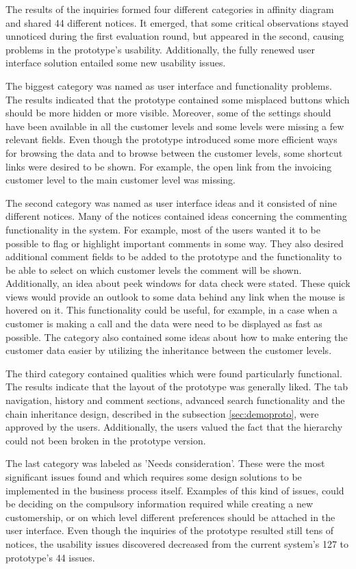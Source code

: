 \documentclass[12pt,a4paper,oneside,pdftex]{report}
\begin{document}
The results of the inquiries formed four different categories in affinity diagram and shared 44 different notices. It emerged, that some critical observations stayed unnoticed during the first evaluation round, but appeared in the second, causing problems in the prototype's usability. Additionally, the fully renewed user interface solution entailed some new usability issues. 

The biggest category was named as user interface and functionality problems. The results indicated that the prototype contained some misplaced buttons which should be more hidden or more visible. Moreover, some of the settings should have been available in all the customer levels and some levels were missing a few relevant fields. Even though the prototype introduced some more efficient ways for browsing the data and to browse between the customer levels, some shortcut links were desired to be shown. For example, the open link from the invoicing customer level to the main customer level was missing.  

The second category was named as user interface ideas and it consisted of nine different notices. Many of the notices contained ideas concerning the commenting functionality in the system. For example, most of the users wanted it to be possible to flag or highlight important comments in some way. They also desired additional comment fields to be added to the prototype and the functionality to be able to select on which customer levels the comment will be shown. Additionally, an idea about peek windows for data check were stated. These quick views would provide an outlook to some data behind any link when the mouse is hovered on it. This functionality could be useful, for example, in a case when a customer is making a call and the data were need to be displayed as fast as possible. The category also contained some ideas about how to make entering the customer data easier by utilizing the inheritance between the customer levels. 

The third category contained qualities which were found particularly functional. The results indicate that the layout of the prototype was generally liked. The tab navigation, history and comment sections, advanced search functionality and the chain inheritance design, described in the subsection \ref{sec:demoproto}, were approved by the users. Additionally, the users valued the fact that the hierarchy could not been broken in the prototype version. 

The last category was labeled as 'Needs consideration'. These were the most significant issues found and which requires some design solutions to be implemented in the business process itself. Examples of this kind of issues, could be deciding on the compulsory information required while creating a new customership, or on which level different preferences should be attached in the user interface. Even though the inquiries of the prototype resulted still tens of notices, the usability issues discovered decreased from the current system's 127 to prototype's 44 issues. 
\end{document}
